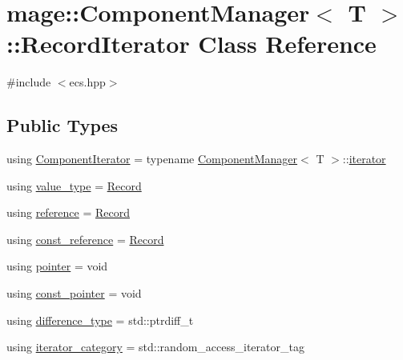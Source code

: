 \hypertarget{classmage_1_1_component_manager_1_1_record_iterator}{}\section{mage\+:\+:Component\+Manager$<$ T $>$\+:\+:Record\+Iterator Class Reference}
\label{classmage_1_1_component_manager_1_1_record_iterator}


{\ttfamily \#include $<$ecs.\+hpp$>$}

\subsection*{Public Types}
\begin{DoxyCompactItemize}
\item 
using \mbox{\hyperlink{classmage_1_1_component_manager_1_1_record_iterator_aa9973dbab16d4cf276118634b8b43ece}{Component\+Iterator}} = typename \mbox{\hyperlink{classmage_1_1_component_manager}{Component\+Manager}}$<$ T $>$\+::\mbox{\hyperlink{classmage_1_1_component_manager_a28023a75938eb74870ba4b5952ddb61f}{iterator}}
\item 
using \mbox{\hyperlink{classmage_1_1_component_manager_1_1_record_iterator_a0d66c5976026ccaf814be662e08c1436}{value\+\_\+type}} = \mbox{\hyperlink{classmage_1_1_component_manager_1_1_record}{Record}}
\item 
using \mbox{\hyperlink{classmage_1_1_component_manager_1_1_record_iterator_a79a091c8d61811bc67982e19500ab6eb}{reference}} = \mbox{\hyperlink{classmage_1_1_component_manager_1_1_record}{Record}}
\item 
using \mbox{\hyperlink{classmage_1_1_component_manager_1_1_record_iterator_a811f90589628f6726fdf264b0d3b89a0}{const\+\_\+reference}} = \mbox{\hyperlink{classmage_1_1_component_manager_1_1_record}{Record}}
\item 
using \mbox{\hyperlink{classmage_1_1_component_manager_1_1_record_iterator_a2d5e24d6c2530fafb1c3c7fdf6875ea8}{pointer}} = void
\item 
using \mbox{\hyperlink{classmage_1_1_component_manager_1_1_record_iterator_a08a6c4a38e17c6d73b85d0581646e1d9}{const\+\_\+pointer}} = void
\item 
using \mbox{\hyperlink{classmage_1_1_component_manager_1_1_record_iterator_a3ca7b08fca57e3f69c5de58be46edd70}{difference\+\_\+type}} = std\+::ptrdiff\+\_\+t
\item 
using \mbox{\hyperlink{classmage_1_1_component_manager_1_1_record_iterator_a3fb25cab94eee72ee71ccb22c3b2ac7b}{iterator\+\_\+category}} = std\+::random\+\_\+access\+\_\+iterator\+\_\+tag
\end{DoxyCompactItemize}
